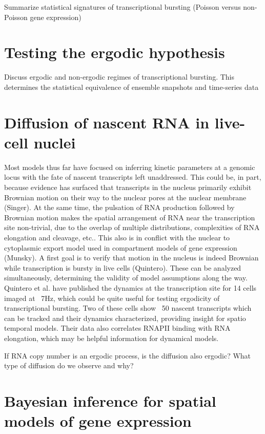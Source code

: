 \documentclass{article}
\begin{document}
Summarize statistical signatures of transcriptional bursting (Poisson versus non-Poisson gene expression)

\section{Testing the ergodic hypothesis}

Discuss ergodic and non-ergodic regimes of transcriptional bursting. This determines the statistical equivalence of ensemble snapshots and time-series data

\section{Diffusion of nascent RNA in live-cell nuclei}

Most models thus far have focused on inferring kinetic parameters at a genomic locus with the fate of nascent transcripts left unaddressed. This could be, in part, because evidence has surfaced that transcripts in the nucleus primarily exhibit Brownian motion on their way to the nuclear pores at the nuclear membrane (Singer). At the same time, the pulsation of RNA production followed by Brownian motion makes the spatial arrangement of RNA near the transcription site non-trivial, due to the overlap of multiple distributions, complexities of RNA elongation and cleavage, etc.. This also is in conflict with the nuclear to cytoplasmic export model used in compartment models of gene expression (Munsky). A first goal is to verify that motion in the nucleus is indeed Brownian while transcription is bursty in live cells (Quintero). These can be analyzed simultaneously, determining the validity of model assumptions along the way. Quintero et al. have published the dynamics at the transcription site for 14 cells imaged at ~7Hz, which could be quite useful for testing ergodicity of transcriptional bursting. Two of these cells show ~50 nascent transcripts which can be tracked and their dynamics characterized, providing insight for spatio temporal models. Their data also correlates RNAPII binding with RNA elongation, which may be helpful information for dynamical models.

If RNA copy number is an ergodic process, is the diffusion also ergodic? What type of diffusion do we observe and why? 

\section{Bayesian inference for spatial models of gene expression}
\end{document}
